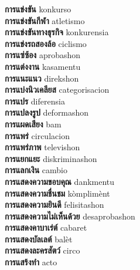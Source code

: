 \textbf{ การแข่งขัน  } konkurso \\
\textbf{ การแข่งขันกีฬา  } atletismo \\
\textbf{ การแข่งขันทางธุรกิจ  } konkurensia \\
\textbf{ การแข่งรถสองล้อ  } ciclismo \\
\textbf{ การแซ่ซ้อง  } aprobashon \\
\textbf{ การแต่งงาน  } kasamentu \\
\textbf{ การแนะแนว  } direkshon \\
\textbf{ การแบ่งนิวเคลียส  } categorisacion \\
\textbf{ การแปร  } diferensia \\
\textbf{ การแปลงรูป  } deformashon \\
\textbf{ การแผดเสียง  } bam \\
\textbf{ การแพร่  } circulacion \\
\textbf{ การแพร่ภาพ  } televishon \\
\textbf{ การแยกแยะ  } diskriminashon \\
\textbf{ การแลกเงิน  } cambio \\
\textbf{ การแสดงความขอบคุณ  } dankmentu \\
\textbf{ การแสดงความชื่นชม  } kòmplimènt \\
\textbf{ การแสดงความยินดี  } felisitashon \\
\textbf{ การแสดงความไม่เห็นด้วย  } desaprobashon \\
\textbf{ การแสดงคาบาเร่ต์  } cabaret \\
\textbf{ การแสดงบัลเลต์  } balèt \\
\textbf{ การแสดงละครสัตว์  } circo \\
\textbf{ การแสร้งทำ  } acto \\
